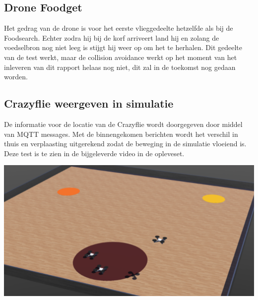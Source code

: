 \subsection{Drone Foodget}
Het gedrag van de drone is voor het eerste vlieggedeelte hetzelfde als bij de Foodsearch. Echter zodra hij bij de korf arriveert land hij en zolang de voedselbron nog niet leeg is stijgt hij weer op om het te herhalen.
Dit gedeelte van de test werkt, maar de collision avoidance werkt op het moment van het inleveren van dit rapport helaas nog niet, dit zal in de toekomst nog gedaan worden.

\subsection{Crazyflie weergeven in simulatie}
De informatie voor de locatie van de Crazyflie wordt doorgegeven door middel van MQTT messages. Met de binnengekomen berichten wordt het verschil in thuis en verplaasting uitgerekend zodat de beweging in de simulatie vloeiend is. Deze test is te zien in de bijgeleverde video in de opleveset.
\begin{center}
    \includegraphics[scale=0.5]{simdrone.png}
\end{center}